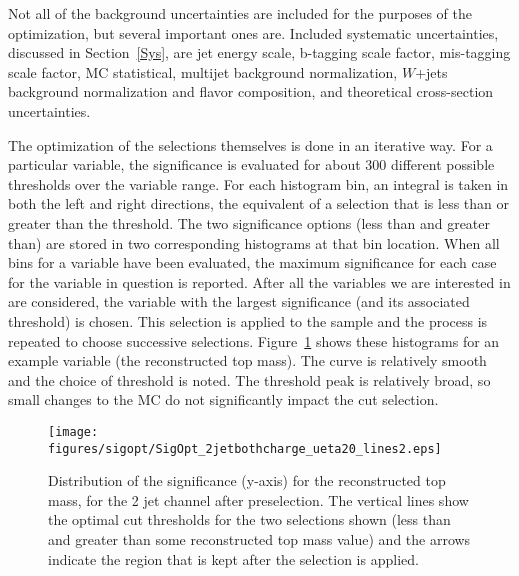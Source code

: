 %	  
Not all of the background uncertainties are included for the purposes of the optimization, but several important ones are.  Included systematic uncertainties, discussed in Section~\ref{Sys}, are jet energy scale, b-tagging scale factor, mis-tagging scale factor, MC statistical, multijet background normalization, $W$+jets background normalization and flavor composition, and theoretical cross-section uncertainties.

The optimization of the selections themselves is done in an iterative way.  For a particular variable, the significance is evaluated for about 300 different possible thresholds over the variable range.  For each histogram bin, an integral is taken in both the left and right directions, the equivalent of a selection that is less than or greater than the threshold.  The two significance options (less than and greater than) are stored in two corresponding histograms at that bin location. When all bins for a variable have been evaluated, the maximum significance for each case for the variable in question is reported.  After all the variables we are interested in are considered, the variable with the largest significance (and its associated threshold) is chosen.  This selection is applied to the sample and the process is repeated to choose successive selections.  Figure~\ref{fig:OPThreshold_cut} shows these histograms for an example variable (the reconstructed top mass).  The curve is relatively smooth and the choice of threshold is noted.  The threshold peak is relatively broad, so small changes to the MC do not significantly impact the cut selection.  

\begin{figure}[!h!tpb]
 \centering
 \texttt{[image: figures/sigopt/SigOpt\_2jetbothcharge\_ueta20\_lines2.eps]}
\vspace{-0.5cm}
 \caption{Distribution of the significance (y-axis) for the reconstructed top mass, for the 2 jet channel after preselection.  The vertical lines show the optimal cut thresholds for the two selections shown (less than and greater than some reconstructed top mass value) and the arrows indicate the region that is kept after the selection is applied.}
 \label{fig:OPThreshold_cut}
 \end{figure}

